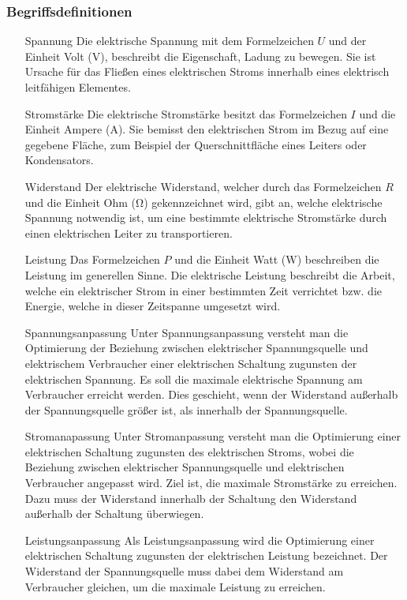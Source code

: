 \documentclass[a4paper]{article}
\begin{document}
    \subsubsection{Begriffsdefinitionen}

    \begin{itemize}
        \item[Spannung]
        Die elektrische Spannung mit dem Formelzeichen $U$ und der Einheit Volt ($\si{\volt}$), beschreibt die Eigenschaft, Ladung zu bewegen.
        Sie ist Ursache für das Fließen eines elektrischen Stroms innerhalb eines elektrisch leitfähigen Elementes.
        \item[Stromstärke]
        Die elektrische Stromstärke besitzt das Formelzeichen $I$ und die Einheit Ampere ($\si{\ampere}$).
        Sie bemisst den elektrischen Strom im Bezug auf eine gegebene Fläche, zum Beispiel der Querschnittfläche eines Leiters oder Kondensators.
        \item[Widerstand]
        Der elektrische Widerstand, welcher durch das Formelzeichen $R$ und die Einheit Ohm ($\si{\ohm}$) gekennzeichnet wird, gibt an, welche elektrische Spannung notwendig ist, um eine bestimmte elektrische Stromstärke durch einen elektrischen Leiter zu transportieren.
        \item[Leistung]
        Das Formelzeichen $P$ und die Einheit Watt ($\si{\watt}$) beschreiben die Leistung im generellen Sinne.
        Die elektrische Leistung beschreibt die Arbeit, welche ein elektrischer Strom in einer bestimmten Zeit verrichtet bzw. die Energie, welche in dieser Zeitspanne umgesetzt wird.
        \item[Spannungsanpassung]
        Unter Spannungsanpassung versteht man die Optimierung der Beziehung zwischen elektrischer Spannungsquelle und elektrischem Verbraucher einer elektrischen Schaltung zugunsten der elektrischen Spannung.
        Es soll die maximale elektrische Spannung am Verbraucher erreicht werden.
        Dies geschieht, wenn der Widerstand außerhalb der Spannungsquelle größer ist, als innerhalb der Spannungsquelle.
        \item[Stromanapassung]
        Unter Stromanpassung versteht man die Optimierung einer elektrischen Schaltung zugunsten des elektrischen Stroms, wobei die Beziehung zwischen elektrischer Spannungsquelle und elektrischen Verbraucher angepasst wird.
        Ziel ist, die maximale Stromstärke zu erreichen.
        Dazu muss der Widerstand innerhalb der Schaltung den Widerstand außerhalb der Schaltung überwiegen.
        \item[Leistungsanpassung]
        Als Leistungsanpassung wird die Optimierung einer elektrischen Schaltung zugunsten der elektrischen Leistung bezeichnet.
        Der Widerstand der Spannungsquelle muss dabei dem Widerstand am Verbraucher gleichen, um die maximale Leistung zu erreichen.
    \end{itemize}
\end{document}

